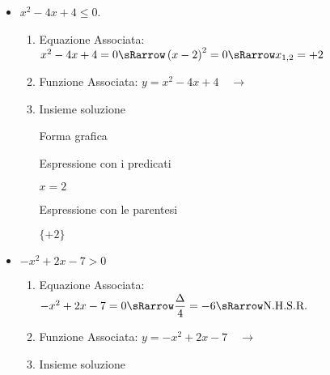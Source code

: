 \begin{esempio}
\begin{itemize}
\item \(x^2-4x+4\le0\).

\begin{enumerate}
 \item
  Equazione Associata:~\(x^2-4x+4=0 \sRarrow 
                        \left(x-2 \right)^2=0 \sRarrow 
                        x_{1,2}=+2\)
 \item 
  \begin{minipage}{.45\textwidth}
  Funzione Associata: \(y = x^2-4x+4 \quad \rightarrow\)
  \end{minipage}
  \begin{minipage}{.30\textwidth}
  \end{minipage}
 \item 
 Insieme soluzione\\
 
  \begin{minipage}{.32\textwidth}
  Forma grafica\\[-.7em]
  
 \begin{center}
  \vspace{.4em}
 \end{center}
  \end{minipage}
  \begin{minipage}{.32\textwidth}
  Espressione con i predicati\\[-.3em]
  
 \begin{center}
  \(x=2\)
  \vspace{1em}
 \end{center}
  \end{minipage}
  \begin{minipage}{.32\textwidth}
  Espressione con le parentesi\\[-.3em]
  
 \begin{center}
  \(\lbrace +2 \rbrace\)
  \vspace{.8em}
 \end{center}
  \end{minipage}
\end{enumerate}

\item \(-x^2+2x-7>0\)

\begin{enumerate}
 \item
  Equazione Associata:~\(-x^2+2x-7=0 \sRarrow 
                        \dfrac{\Delta}{4} = -6 \sRarrow 
                        \text{N.H.S.R.}\)
 \item 
  \begin{minipage}{.45\textwidth}
  Funzione Associata: \(y = -x^2+2x-7 \quad \rightarrow\)
  \end{minipage}
  \begin{minipage}{.30\textwidth}
  \parabolaamidmi
  \end{minipage}
 \item 
 Insieme soluzione\\
 

\end{enumerate}
\end{itemize}
\end{esempio}
